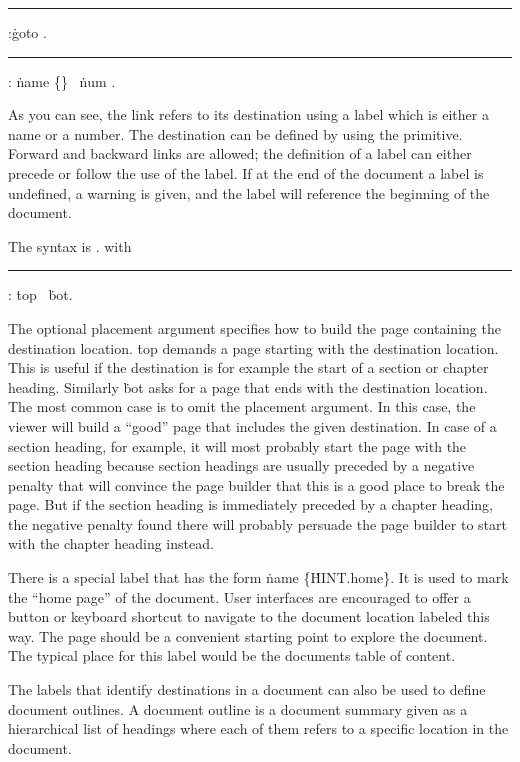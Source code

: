 \medskip
\rule {}:\.{goto} .
\rule {}:
  \.{name} \.{\{}\.{\}} \OR\ \.{num} .
\medskip

As you can see, the link refers to its destination using a label
which is either a name or a number.
The destination can be defined by using the 
 primitive.
Forward and backward links are allowed; the definition of a label can either
precede or follow the use of the label. If at the end of the document a label
is undefined, a warning is given, and the label will reference the beginning of the
document.

The syntax is
\medskip
\prim{}  .
\medskip
with
\medskip
\rule{}:
\.{top} \OR\ \.{bot}.
\medskip

The optional placement argument specifies how to build the page 
containing the destination location. \.{top} demands
a page starting with the destination location. This is useful
if the destination is for example the start of a section or chapter heading.
Similarly \.{bot} asks for a page that ends with the destination location.
The most common case is to omit the placement argument. In this case, the
viewer will build a ``good'' page that includes the given destination.
In case of a section heading, for example, it will most probably start the
page with the section heading because section headings are usually preceded
by a negative penalty that will convince the page builder that this is a good
place to break the page. But if the section heading is immediately preceded
by a chapter heading, the negative penalty found there will probably
persuade the page builder to start with the chapter heading instead.

There is a special label that has the form
\.{name} \.{\{}\.{HINT.home}\.{\}}.
It is used to mark the ``home page'' of the document. User interfaces
are encouraged to offer a button or keyboard shortcut to navigate to the
document location labeled this way. The page should be a convenient
starting point to explore the document. The typical place for this label
would be the documents table of content.

The labels that identify destinations in a document can also be used
to define document outlines. A document outline is a document summary
given as a hierarchical list of headings where each of them
refers to a specific location in the document.

